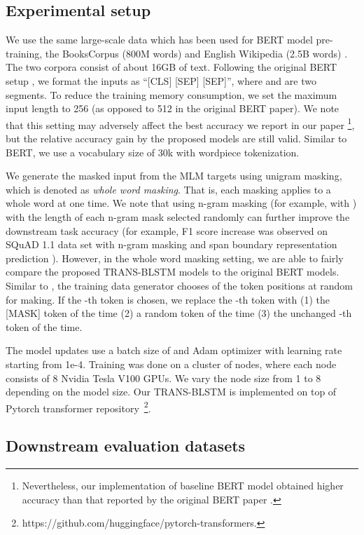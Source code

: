 \documentclass[11pt,a4paper]{article}
\begin{document}
\subsection{Experimental setup}

We use the same large-scale data which has been used for BERT model pre-training, the BooksCorpus (800M words) \cite{zhu2015} and English Wikipedia (2.5B words) \cite{wiki2004,devlin2018}. The two corpora consist of about 16GB of text. Following the original BERT setup \cite{devlin2018}, we format the inputs as ``[CLS]  [SEP]  [SEP]'', where  and  are two segments. To reduce the training memory consumption, we set the maximum input length to 256 (as opposed to 512 in the original BERT paper). We note that this setting may adversely affect the best accuracy we report in our paper \footnote{Nevertheless, our implementation of baseline BERT model obtained higher accuracy than that reported by the original BERT paper \cite{devlin2018}.}, but the relative accuracy gain by the proposed models are still valid. Similar to BERT, we use a vocabulary size of 30k with wordpiece tokenization. 

We generate the masked input from the MLM targets using unigram masking, which is denoted as \textit{whole word masking}. That is, each masking applies to a whole word at one time. We note that using n-gram masking (for example, with ) \cite{joshi2019,lan2019} with the length of each n-gram mask selected randomly can further improve the downstream task accuracy (for example,  F1 score increase was observed on SQuAD 1.1 data set with n-gram masking and span boundary representation prediction \cite{joshi2019}). However, in the whole word masking setting, we are able to fairly compare the proposed TRANS-BLSTM models to the original BERT models. Similar to \cite{devlin2018}, the training data generator chooses  of the token positions at random for making. If the -th token is chosen, we replace the -th token with (1) the [MASK] token  of the time (2) a random token  of the time (3) the unchanged -th token  of the time. 

The model updates use a batch size of  and Adam optimizer with learning rate starting from 1e-4. Training was done on a cluster of nodes, where each node consists of 8 Nvidia Tesla V100 GPUs. We vary the node size from 1 to 8 depending on the model size. Our TRANS-BLSTM is implemented on top of Pytorch transformer repository~\footnote{https://github.com/huggingface/pytorch-transformers.}. 

\subsection{Downstream evaluation datasets}
\end{document}
